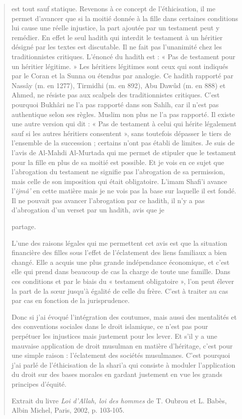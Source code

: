 \begin{quote}
est tout sauf statique. Revenons à ce concept de l'éthicisation, il me
permet d'avancer que si la moitié donnée à la fille dans certaines
conditions lui cause une réelle injustice, la part ajoutée par un
testament peut y remédier. En effet le seul hadith qui interdit le
testament à un héritier désigné par les textes est discutable. Il ne
fait pas l'unanimité chez les traditionnistes critiques. L'énoncé du
hadith est : « Pas de testament pour un héritier légitime. » Les
héritiers légitimes sont ceux qui sont indiqués par le Coran et la Sunna
ou étendus par analogie. Ce hadith rapporté par Nassây (m. en 1277),
Tirmidhi (m. en 892), Abu Dawûd (m. en 888) et Ahmed, ne résiste pas aux
scalpels des traditionnistes critiques. C'est pourquoi Bukhâri ne l'a
pas rapporté dans son Sahîh, car il n'est pas authentique selon ses
règles. Muslim non plus ne l'a pas rapporté. Il existe une autre version
qui dit : « Pas de testament à celui qui hérite légalement sauf si les
autres héritiers consentent », sans toutefois dépasser le tiers de
l'ensemble de la succession ; certains n'ont pas établi de limites. Je
suis de l'avis de Al-Mahdi Al-Murtada qui me permet de stipuler que le
testament pour la fille en plus de sa moitié est possible. Et je vois en
ce sujet que l'abrogation du testament ne signifie pas l'abrogation de
sa permission, mais celle de son imposition qui était obligatoire.
L'imam Shafi'i avance l'\emph{ijmâ'} en cette matière mais je ne vois
pas la base sur laquelle il est fondé. Il ne pouvait pas avancer
l'abrogation par ce hadith, il n'y a pas d'abrogation d'un verset par un
hadith, avis que je

partage.

L'une des raisons légales qui me permettent cet avis est que la
situation financière des filles sous l'effet de l'éclatement des liens
familiaux a bien changé. Elle a acquis une plus grande indépendance
économique, et c'est elle qui prend dans beaucoup de cas la charge de
toute une famille. Dans ces conditions et par le biais du « testament
obligatoire », l'on peut élever la part de la sœur jusqu'à égalité de
celle du frère. C'est à traiter au cas par cas en fonction de la
jurisprudence.

Donc si j'ai évoqué l'intégration des coutumes, mais aussi des
mentalités et des conventions sociales dans le droit islamique, ce n'est
pas pour perpétuer les injustices mais justement pour les lever. Et s'il
y a une mauvaise application de droit musulman en matière d'héritage,
c'est pour une simple raison : l'éclatement des sociétés musulmanes.
C'est pourquoi j'ai parlé de l'éthicisation de la shari'a qui consiste à
moduler l'application du droit sur des bases morales en gardant
justement en vue les grands principes d'équité.

Extrait du livre \emph{Loi d'Allah, loi des hommes} de T. Oubrou et L.
Babès, Albin Michel, Paris, 2002, p. 103-105.
\end{quote}

